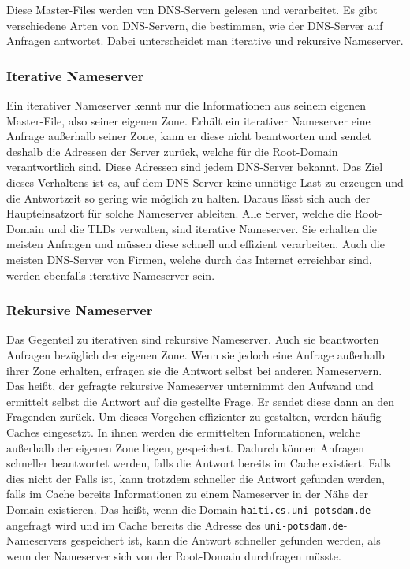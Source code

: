 \documentclass[a4paper, 12pt, BCOR10mm, DIV12, toc=bibliography, toc=listof, german]{scrbook}
\begin{document}
			Diese Master-Files werden von DNS-Servern gelesen und verarbeitet. Es gibt verschiedene Arten
			von DNS-Servern, die bestimmen, wie der DNS-Server auf Anfragen antwortet. Dabei
			unterscheidet man iterative und rekursive Nameserver.

			\subsubsection*{Iterative Nameserver} %

			Ein iterativer Nameserver kennt nur die Informationen aus seinem eigenen Master-File, also
			seiner eigenen Zone. Erhält ein iterativer Nameserver eine Anfrage außerhalb seiner Zone, kann
			er diese nicht beantworten und sendet deshalb die Adressen der Server zurück, welche für die
			Root-Domain verantwortlich sind. Diese Adressen sind jedem DNS-Server bekannt. Das Ziel dieses
			Verhaltens ist es, auf dem DNS-Server keine unnötige Last zu erzeugen und die Antwortzeit so
			gering wie möglich zu halten. Daraus lässt sich auch der Haupteinsatzort für solche Nameserver
			ableiten. Alle Server, welche die Root-Domain und die TLDs verwalten, sind iterative
			Nameserver. Sie erhalten die meisten Anfragen und müssen diese schnell und effizient
			verarbeiten. Auch die meisten DNS-Server von Firmen, welche durch das Internet erreichbar
			sind, werden ebenfalls iterative Nameserver sein.


			\subsubsection*{Rekursive Nameserver} %

			Das Gegenteil zu iterativen sind rekursive Nameserver. Auch sie beantworten Anfragen bezüglich
			der eigenen Zone. Wenn sie jedoch eine Anfrage außerhalb ihrer Zone erhalten, erfragen sie die
			Antwort selbst bei anderen Nameservern. Das heißt, der gefragte rekursive Nameserver
			unternimmt den Aufwand und ermittelt selbst die Antwort auf die gestellte Frage. Er sendet
			diese dann an den Fragenden zurück. Um dieses Vorgehen effizienter zu gestalten, werden häufig
			Caches eingesetzt. In ihnen werden die ermittelten Informationen, welche außerhalb der eigenen
			Zone liegen, gespeichert. Dadurch können Anfragen schneller beantwortet werden, falls die
			Antwort bereits im Cache existiert. Falls dies nicht der Falls ist, kann trotzdem schneller
			die Antwort gefunden werden, falls im Cache bereits Informationen zu einem Nameserver in der
			Nähe der Domain existieren. Das heißt, wenn die Domain \texttt{haiti.cs.uni-potsdam.de}
			angefragt wird und im Cache bereits die Adresse des \texttt{uni-potsdam.de}-Nameservers
			gespeichert ist, kann die Antwort schneller gefunden werden, als wenn der Nameserver sich von
			der Root-Domain durchfragen müsste.
\end{document}
